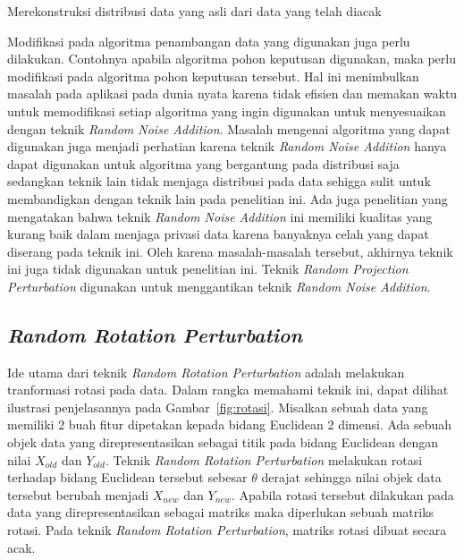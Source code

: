\begin{algorithm}
	\DontPrintSemicolon\SetAlgoNoLine\LinesNumbered
	
	\setcounter{AlgoLine}{0}

	\caption{Merekonstruksi distribusi data yang asli dari data yang telah diacak}
	\label{alg:rekonstruksi}
\end{algorithm}

Modifikasi pada algoritma penambangan data yang digunakan juga perlu dilakukan. Contohnya apabila algoritma pohon keputusan digunakan, maka perlu modifikasi pada algoritma pohon keputusan tersebut. Hal ini menimbulkan masalah pada aplikasi pada dunia nyata karena tidak efisien dan memakan waktu untuk memodifikasi setiap algoritma yang ingin digunakan untuk menyesuaikan dengan teknik \textit{Random Noise Addition}. Masalah mengenai algoritma yang dapat digunakan juga menjadi perhatian karena teknik \textit{Random Noise Addition} hanya dapat digunakan untuk algoritma yang bergantung pada distribusi saja sedangkan teknik lain tidak menjaga distribusi pada data sehigga sulit untuk membandigkan dengan teknik lain pada penelitian ini. Ada juga penelitian yang mengatakan bahwa teknik \textit{Random Noise Addition} ini memiliki kualitas yang kurang baik dalam menjaga privasi data karena banyaknya celah yang dapat diserang pada teknik ini. Oleh karena masalah-masalah tersebut, akhirnya teknik ini juga tidak digunakan untuk penelitian ini. Teknik \textit{Random Projection Perturbation} digunakan untuk menggantikan teknik \textit{Random Noise Addition}.

\subsection{\textit{Random Rotation Perturbation}}
\label{subsec:rrp}

Ide utama dari teknik \textit{Random Rotation Perturbation} adalah melakukan tranformasi rotasi pada data. Dalam rangka memahami teknik ini, dapat dilihat ilustrasi penjelasannya pada Gambar~\ref{fig:rotasi}. Misalkan sebuah data yang memiliki 2 buah fitur dipetakan kepada bidang Euclidean 2 dimensi. Ada sebuah objek data yang direpresentasikan sebagai titik pada bidang Euclidean dengan nilai \(X_{old}\) dan \(Y_{old}\). Teknik \textit{Random Rotation Perturbation} melakukan rotasi terhadap bidang Euclidean tersebut sebesar \(\theta\) derajat sehingga nilai objek data tersebut berubah menjadi \(X_{new}\) dan \(Y_{new}\). Apabila rotasi tersebut dilakukan pada data yang direpresentasikan sebagai matriks maka diperlukan sebuah matriks rotasi. Pada teknik \textit{Random Rotation Perturbation}, matriks rotasi dibuat secara acak.

